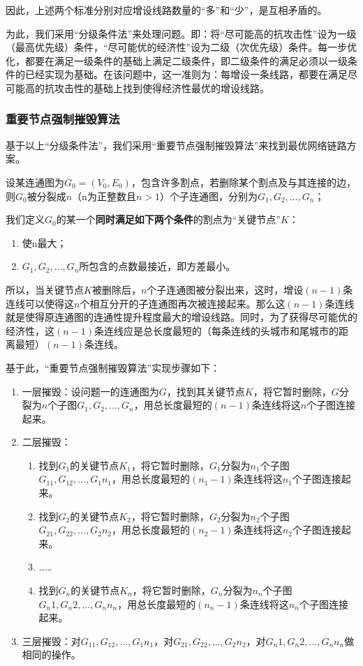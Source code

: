 \documentclass{article}
\begin{document}
因此，上述两个标准分别对应增设线路数量的“多”和“少”，是互相矛盾的。

为此，我们采用“分级条件法”来处理问题。即：将“尽可能高的抗攻击性”设为一级（最高优先级）条件，“尽可能优的经济性”设为二级（次优先级）条件。每一步优化，都要在满足一级条件的基础上满足二级条件，即二级条件的满足必须以一级条件的已经实现为基础。在该问题中，这一准则为：每增设一条线路，都要在满足尽可能高的抗攻击性的基础上找到使得经济性最优的增设线路。

\subsubsection{重要节点强制摧毁算法}
\label{重要节点强制摧毁算法}

基于以上“分级条件法”，我们采用“重要节点强制摧毁算法”来找到最优网络链路方案。

设某连通图为$G_0=(V_0,E_0)$，包含许多割点，若删除某个割点及与其连接的边，则$G_0$被分裂成$n$（n为正整数且$n>1$）个子连通图，分别为$G_1,G_2,\dots, G_n$；

我们定义$G_0$的某一个\textbf{同时满足如下两个条件}的割点为“关键节点”$K$：

\begin{enumerate}
	\item 使n最大；
	\item $G_1,G_2,\dots, G_n$所包含的点数最接近，即方差最小。
\end{enumerate}

所以，当关键节点$K$被删除后，$n$个子连通图被分裂出来，这时，增设$(n-1)$条连线可以使得这$n$个相互分开的子连通图再次被连接起来。那么这$(n-1)$条连线就是使得原连通图的连通性提升程度最大的增设线路。同时，为了获得尽可能优的经济性，这$(n-1)$条连线应是总长度最短的（每条连线的头城市和尾城市的距离最短）$(n-1)$条连线。

基于此，“重要节点强制摧毁算法”实现步骤如下：

\begin{enumerate}
	\item 一层摧毁：设问题一的连通图为$G$，找到其关键节点$K$，将它暂时删除，$G$分裂为$n$个子图$G_1,G_2,\dots, G_n$，用总长度最短的$(n-1)$条连线将这$n$个子图连接起来。
	\item 二层摧毁：

		\begin{enumerate}
			\item 找到$G_1$的关键节点$K_1$，将它暂时删除，$G_1$分裂为$n_1$个子图$G_11,G_12,\dots, G_1n_1$，用总长度最短的$(n_1-1)$条连线将这$n_1$个子图连接起来。
			\item 找到$G_2$的关键节点$K_2$，将它暂时删除，$G_2$分裂为$n_2$个子图$G_21,G_22,\dots, G_2n_2$，用总长度最短的$(n_2-1)$条连线将这$n_2$个子图连接起来。
			\item ……
			\item 找到$G_n$的关键节点$K_n$，将它暂时删除，$G_n$分裂为$n_n$个子图$G_n1,G_n2,\dots, G_nn_n$，用总长度最短的$(n_n-1)$条连线将这$n_n$个子图连接起来。
		\end{enumerate}

	\item 三层摧毁：对$G_11,G_12,\dots, G_1n_1$，对$G_21,G_22,\dots, G_2n_2$，对$G_n1,G_n2,\dots, G_nn_n$做相同的操作。
\end{enumerate}
\end{document}
